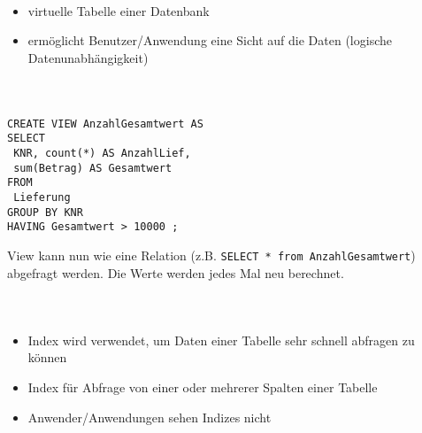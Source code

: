 
\begin{frame}[fragile]
\frametitle{\insertsection}\framesubtitle{\insertsubsection}
\\[4pt]
\begin{itemize}
	\item virtuelle Tabelle einer Datenbank
	\item erm\"oglicht Benutzer/Anwendung eine Sicht auf die Daten (logische Datenunabhängigkeit)
\end{itemize} 
\end{frame}

\begin{frame}[fragile]\frametitle{\insertsection}
\framesubtitle{\insertsubsection}
\onslide
{}\\[4pt]
\begin{lstlisting}[xleftmargin=3ex]
CREATE VIEW AnzahlGesamtwert AS
SELECT
 KNR, count(*) AS AnzahlLief,
 sum(Betrag) AS Gesamtwert
FROM
 Lieferung
GROUP BY KNR
HAVING Gesamtwert > 10000 ;
\end{lstlisting}
\pause 
View kann nun wie eine Relation (z.B. \texttt{SELECT * from AnzahlGesamtwert}) abgefragt werden. 
\nl
Die Werte werden jedes Mal neu berechnet.
\end{frame}

\begin{frame}[fragile]
\frametitle{\insertsection}\framesubtitle{\insertsubsection}
\\[4pt]
\begin{itemize}
	\item Index wird verwendet, um Daten einer Tabelle sehr schnell abfragen zu k\"onnen
	\item Index für Abfrage von einer oder mehrerer Spalten einer Tabelle 
	\item Anwender/Anwendungen sehen Indizes nicht
\end{itemize}
\abs
\end{frame}

